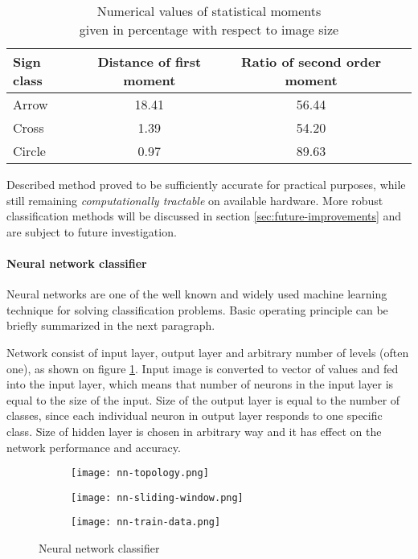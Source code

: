 \begin{table}[th!]
\centering
	\begin{tabular}{l*{2}{c}r}
		\toprule
		Sign class			& Distance of first moment & Ratio of second order moment  \\
		\hline
		Arrow 				& 18.41 & 56.44  \\
		Cross            	& 1.39 & 54.20  \\
		Circle           	& 0.97 & 89.63  \\
		\bottomrule
	\end{tabular}
\caption{Numerical values of statistical moments \\given in percentage with respect to image size}
\label{tab:moments}
\end{table}

Described method proved to be sufficiently accurate for practical purposes, while still remaining \textit{computationally tractable} on available hardware. More robust classification methods will be discussed in section \ref{sec:future-improvements} and are subject to future investigation.

\paragraph{Neural network classifier}


Neural networks are one of the well known and widely used machine learning technique for solving classification problems. Basic operating principle can be briefly summarized in the next paragraph.

Network consist of input layer, output layer and arbitrary number of levels (often one), as shown on figure \ref{fig:nn-topology}. Input image is converted to vector of values and fed into the input layer, which means that number of neurons in the input layer is equal to the size of the input. Size of the output layer is equal to the number of classes, since each individual neuron in output layer responds to one specific class. Size of hidden layer is chosen in arbitrary way and it has effect on the network performance and accuracy.


\begin{figure}[th!]
	\centering
	\begin{subfigure}[b]{1\textwidth}
		\centering
		\texttt{[image: nn-topology.png]}
		\label{fig:nn-topology}
	\end{subfigure}
	\begin{subfigure}[b]{0.45\textwidth}
		\centering
		\texttt{[image: nn-sliding-window.png]}
		\label{fig:nn-sliding-window}
	\end{subfigure}
	\begin{subfigure}[b]{0.45\textwidth}
		\centering
		\texttt{[image: nn-train-data.png]}
		\label{fig:nn-train-data}
	\end{subfigure}
	\caption{Neural network classifier}
	\label{fig:nn-general}
\end{figure}


